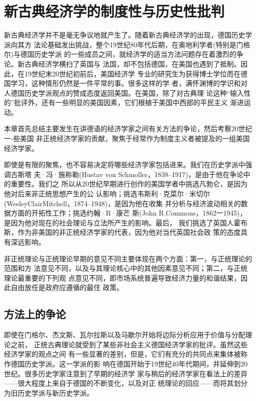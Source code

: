 \chapter{新古典经济学的制度性与历史性批判}

新古典经济学并不是毫无争议地就产生了。随着新古典经济学的出现，德国历史学派向其方
法论基础发出挑战，整个19世纪80年代后期，在奥地利学者(特别是门格尔)与德国历史学派
的一些成员之间，就经济学的适当方法问题存在着激烈的争论。新古典经济学横扫了英国与
法国，却不包括德国，在美国也遇到了抵制。因此，在19世纪末20世纪初前后，美国经济学
专业的研究生为获得博士学位而在德国学习，这种情形仍然是一件平常的事。很多这样的学
者，满怀渊博的学识和对人德国历史学派观点的赞成态度返回美国。在美国，除了对古典理
论这种“输入性的”批评外，还有一些明显的美国因素，它们根植于美国中西部的平民主义
渐进运动。

本章首先总结主要发生在讲德语的经济学家之间有关方法的争论，然后考察20世纪一-些美国
非正统经济学家的贡献，聚焦于经常作为制度主义者被提及的一组美国经济学家。

即使是有限的聚焦，也不容易决定将哪些经济学家包括进来。我们在历史学派中强调古斯塔
夫·冯·施称勒(Hustav von Schmoller，1838--1917)，是由于他在争论中的重要性。我们之
所以从20世纪早期进行创作的美国学者中挑选凡勃仑，是因为他对后来非正统思想产生的公
认影响；挑选韦斯利·克菜尔·米切尔(WesleyClairMitchell，1874--1948)，是因为他在收集
并分析与经济波动相关的数据方面的开拓性工作；挑选约翰·R·康芒
斯(John R.Commons，1862一1945)，是因为他对现在的社会理论与立法所产生的影响。最后，
我们挑选了英国人霍布斯，作为非美国的非正统经济学家的代表，因为他对当代英国社会政
策的态度具有深远影响。

非正统理论与正统理论早期的意见不同主要体现在两个方面：第一，与正统理论的范围和方
法意见不同，以及与其理论核心中的其他因素意见不同；第二，与正统理论最重要的下列观
点意见不同，即市场系统普遍导致经济力量的和谐结果，因此自由放任是政府应遵循的最住
政策。

\section{方法上的争论}

即使在门格尔、杰文斯、瓦尔拉斯以及马歇尔开始将边际分析应用于价值与分配理论之前，
正统古典理论就受到了某些非社会主义德国经济学家的批评。虽然这些经济学家的观点之间
有一些显著的差别，但是，它们有充分的共同点来集体被称作德国历史学派。这一学派的影
响在德国开始于19世纪40年代期间，并延伸到20世纪。很多历史学家注意到了早期的经济学
家与稍后的经济学家在看法上的差异——很大程度上来自于德国的不断变化，以及对正
统理论的回应——而将其划分为旧历史学派与新历史学派。

